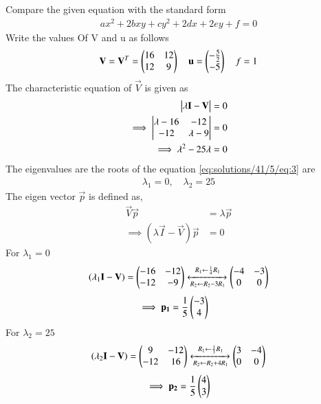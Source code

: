 Compare the given equation with the standard form
\begin{align}\label{eq:solutions/41/5/eq:1}
    ax^2+2bxy+cy^2+2dx+2ey+f = 0
\end{align}
Write the values Of V and u as follows
\begin{align}
    \mathbf{V} = \mathbf{V}^T = \begin{pmatrix}16 & 12\\12 & 9\end{pmatrix} \quad
    \mathbf{u} =\begin{pmatrix}-\frac{5}{2} \\ -5\end{pmatrix} \quad
     f = 1 \label{eq:solutions/41/5/eq:2}
\end{align}
The characteristic equation of $\vec{V}$ is given as
\begin{align}
    \begin{vmatrix}\lambda\mathbf{I}-\mathbf{V}\end{vmatrix} = 0\\
    \implies \begin{vmatrix}\lambda-16 & -12 \\ -12 & \lambda-9\end{vmatrix} = 0\\
    \implies \lambda^2 -25\lambda = 0 \label{eq:solutions/41/5/eq:3}
\end{align}
The eigenvalues are the roots of the equation \eqref{eq:solutions/41/5/eq:3} are
\begin{align}
    \lambda_{1} = 0, \quad \lambda_{2} = 25 \label{eq:solutions/41/5/eq:4}
\end{align}
The eigen vector $\vec{p}$ is defined as, 
\begin{align}
    \vec{V}\vec{p} &= \lambda\vec{p}\\
    \implies(\lambda\vec{I}-\vec{V})\vec{p}&=0
\end{align}
For $\lambda_1=0$
\begin{align}
    (\lambda_1\mathbf{I}-\mathbf{V}) = \begin{pmatrix}-16 & -12\\-12 & -9\end{pmatrix}\xleftrightarrow[R_2\leftarrow R_2-3R_1]{R_1\leftarrow \frac{1}{4}R_1}\begin{pmatrix}-4 & -3\\0 & 0\end{pmatrix}
\end{align}
\begin{align}
    \implies\mathbf{p_1}&=\frac{1}{5}\begin{pmatrix}-3\\4\end{pmatrix}\label{eq:solutions/41/5/eq:p1val}
\end{align}
For $\lambda_2=25$
\begin{align}
    (\lambda_2\mathbf{I}-\mathbf{V}) = \begin{pmatrix}9 & -12\\-12 & 16\end{pmatrix}\xleftrightarrow[R_2\leftarrow R_2+4R_1]{R_1\leftarrow \frac{1}{3}R_1}\begin{pmatrix}3 & -4\\0 & 0\end{pmatrix}
\end{align}
\begin{align}
    \implies\mathbf{p_2}=\frac{1}{5}\begin{pmatrix}4\\3\end{pmatrix}\label{eq:solutions/41/5/eq:p2val}
\end{align}
